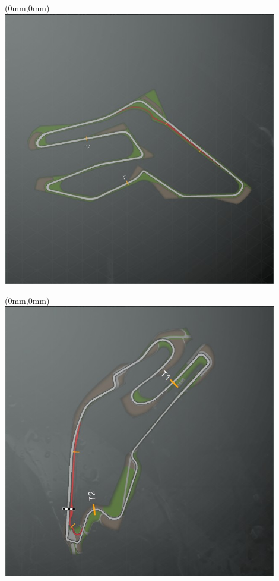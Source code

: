 \null\newpage
\begin{textblock*}{30mm}(0mm,0mm)%
\includegraphics[width=120mm]{TR/2015-05-20_00070.png}
\end{textblock*}
\null\newpage
\begin{textblock*}{30mm}(0mm,0mm)%
\includegraphics[width=120mm]{TR/2015-05-20_00032.png}
\end{textblock*}
